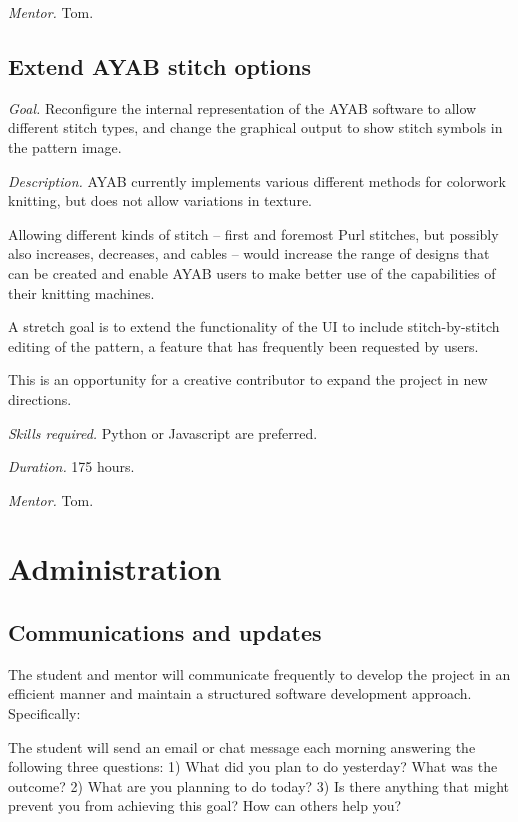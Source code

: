 \documentclass{article}
\begin{document}
\textit{Mentor.} Tom.


\subsection{Extend AYAB stitch options} 

\textit{Goal.} Reconfigure the internal representation of the AYAB software to allow different stitch types, and change the graphical output to show stitch symbols in the pattern image.

\textit{Description.} AYAB currently implements various different methods for colorwork knitting, but does not allow variations in texture. 

Allowing different kinds of stitch -- first and foremost Purl stitches, but possibly also increases, decreases, and cables -- would increase the range of designs that can be created and enable AYAB users to make better use of the capabilities of their knitting machines.

A stretch goal is to extend the functionality of the UI to include stitch-by-stitch editing of the pattern, a feature that has frequently been requested by users.

This is an opportunity for a creative contributor to expand the project in new directions.

\textit{Skills required.} Python or Javascript are preferred.

\textit{Duration.} 175 hours. 

\textit{Mentor.} Tom.


\section{Administration}

\subsection{Communications and updates}

The student and mentor will communicate frequently to develop the project in an efficient manner and
maintain a structured software development approach. Specifically:

The student will send an email or chat message each morning answering the following three questions:
1) What did you plan to do yesterday? What was the outcome?
2) What are you planning to do today?
3) Is there anything that might prevent you from achieving this goal? How can others help
you?
\end{document}

